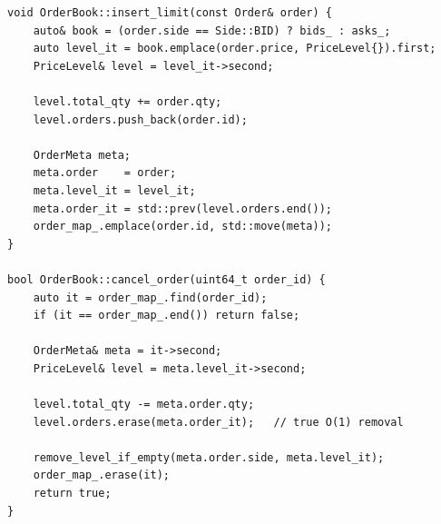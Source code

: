 \documentclass[11pt,a4paper]{article}
\begin{document}
\begin{lstlisting}[caption={Phase 3 insertion and immediate cancellation
(\texttt{orderbook.cpp})}]
void OrderBook::insert_limit(const Order& order) {
    auto& book = (order.side == Side::BID) ? bids_ : asks_;
    auto level_it = book.emplace(order.price, PriceLevel{}).first;
    PriceLevel& level = level_it->second;

    level.total_qty += order.qty;
    level.orders.push_back(order.id);

    OrderMeta meta;
    meta.order    = order;
    meta.level_it = level_it;
    meta.order_it = std::prev(level.orders.end());
    order_map_.emplace(order.id, std::move(meta));
}

bool OrderBook::cancel_order(uint64_t order_id) {
    auto it = order_map_.find(order_id);
    if (it == order_map_.end()) return false;

    OrderMeta& meta = it->second;
    PriceLevel& level = meta.level_it->second;

    level.total_qty -= meta.order.qty;
    level.orders.erase(meta.order_it);   // true O(1) removal

    remove_level_if_empty(meta.order.side, meta.level_it);
    order_map_.erase(it);
    return true;
}
\end{lstlisting}
\end{document}
